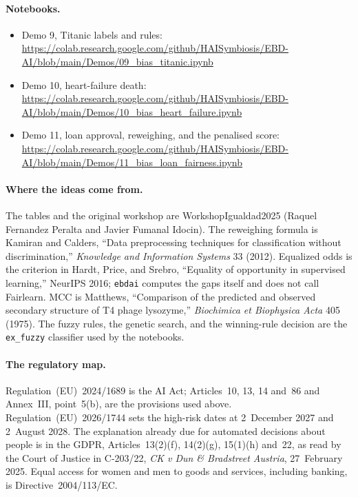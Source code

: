 \documentclass[11pt]{article}
\newcommand{\fn}[1]{\texttt{\small #1}}
\begin{document}
{\small
{}
\paragraph{Notebooks.}
\begin{itemize}[itemsep=0.2em]
  \item Demo 9, Titanic labels and rules:\\
  {\footnotesize\url{https://colab.research.google.com/github/HAISymbiosis/EBD-AI/blob/main/Demos/09_bias_titanic.ipynb}}
  \item Demo 10, heart-failure death:\\
  {\footnotesize\url{https://colab.research.google.com/github/HAISymbiosis/EBD-AI/blob/main/Demos/10_bias_heart_failure.ipynb}}
  \item Demo 11, loan approval, reweighing, and the penalised score:\\
  {\footnotesize\url{https://colab.research.google.com/github/HAISymbiosis/EBD-AI/blob/main/Demos/11_bias_loan_fairness.ipynb}}
\end{itemize}

\paragraph{Where the ideas come from.}
The tables and the original workshop are WorkshopIgualdad2025 (Raquel Fernandez Peralta and Javier Fumanal Idocin). The reweighing formula is Kamiran and Calders, ``Data preprocessing techniques for classification without discrimination,'' \emph{Knowledge and Information Systems} 33 (2012). Equalized odds is the criterion in Hardt, Price, and Srebro, ``Equality of opportunity in supervised learning,'' NeurIPS 2016; \fn{ebdai} computes the gaps itself and does not call Fairlearn. MCC is Matthews, ``Comparison of the predicted and observed secondary structure of T4 phage lysozyme,'' \emph{Biochimica et Biophysica Acta} 405 (1975). The fuzzy rules, the genetic search, and the winning-rule decision are the \fn{ex\_fuzzy} classifier used by the notebooks.

\paragraph{The regulatory map.}
Regulation~(EU)~2024/1689 is the AI Act; Articles~10, 13, 14 and~86 and Annex~III, point~5(b), are the provisions used above. Regulation~(EU)~2026/1744 sets the high-risk dates at 2~December 2027 and 2~August 2028. The explanation already due for automated decisions about people is in the GDPR, Articles~13(2)(f), 14(2)(g), 15(1)(h) and~22, as read by the Court of Justice in C-203/22, \emph{CK v Dun \& Bradstreet Austria}, 27~February 2025. Equal access for women and men to goods and services, including banking, is Directive~2004/113/EC.
}
\end{document}
